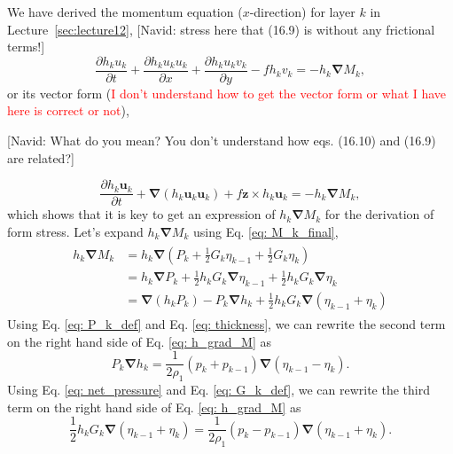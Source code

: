 We have derived the momentum equation ($x$-direction) for layer $k$ in Lecture~\ref{sec:lecture12}, {\color{red}[Navid: stress here that (16.9) is without any frictional terms!]}
\begin{equation}
    \frac{\partial h_{k}u_{k}}{\partial t} + \frac{\partial h_{k}u_{k}u_{k} }{\partial x} + \frac{\partial h_{k}u_{k}v_{k} }{\partial y} - f h_{k} v_{k} = - h_{k}\boldsymbol{\nabla} M_{k},
\end{equation}
or its vector form (\textcolor{red}{I don't understand how to get the vector form or what I have here is correct or not}),

{\color{red}[Navid: What do you mean? You don't understand how eqs. (16.10) and (16.9) are related?]}

\begin{equation}
    \frac{\partial h_{k}\boldsymbol{u}_{k}}{\partial t} + \boldsymbol{\nabla} ( h_{k} \boldsymbol{u}_{k} \boldsymbol{u}_{k}) + f \boldsymbol{z} \times h_{k} \boldsymbol{u}_{k} = - h_{k}\boldsymbol{\nabla} M_{k},
    \label{eq: momentum_density_coord}
\end{equation}
which shows that it is key to get an expression of $h_{k}\boldsymbol{\nabla} M_{k}$ for the derivation of form stress.
Let's expand $h_{k}\boldsymbol{\nabla} M_{k}$ using Eq. \eqref{eq: M_k_final},
\begin{align}
    \begin{split}
        h_{k}\boldsymbol{\nabla} M_{k} & = h_{k} \boldsymbol{\nabla} (P_{k} + \frac{1}{2}G_{k}\eta_{k-1} + \frac{1}{2}G_{k}\eta_{k})\\
        & = h_{k}\boldsymbol{\nabla} P_{k} + \frac{1}{2}h_{k}G_{k}\boldsymbol{\nabla} \eta_{k-1} + \frac{1}{2}h_{k}G_{k}\boldsymbol{\nabla} \eta_{k} \\
        & = \boldsymbol{\nabla} (h_{k}P_{k}) - P_{k} \boldsymbol{\nabla} h_{k} + \frac{1}{2}h_{k}G_{k} \boldsymbol{\nabla} (\eta_{k-1} + \eta_{k}) 
    \end{split}
    \label{eq: h_grad_M}
\end{align} 
Using Eq. \eqref{eq: P_k_def} and Eq. \eqref{eq: thickness}, we can rewrite the second term on the right hand side of Eq. \eqref{eq: h_grad_M} as 
$$P_{k} \boldsymbol{\nabla} h_{k} = \frac{1}{2\rho_{1}}(p_{k} + p_{k-1}) \boldsymbol{\nabla} (\eta_{k-1} - \eta_{k}). $$
Using Eq. \eqref{eq: net_pressure} and Eq. \eqref{eq: G_k_def}, we can rewrite the third term on the right hand side of Eq. \eqref{eq: h_grad_M} as
$$\frac{1}{2}h_{k}G_{k} \boldsymbol{\nabla} (\eta_{k-1} + \eta_{k}) = \frac{1}{2\rho_{1}}(p_{k} - p_{k-1}) \boldsymbol{\nabla} (\eta_{k-1} + \eta_{k}). $$
